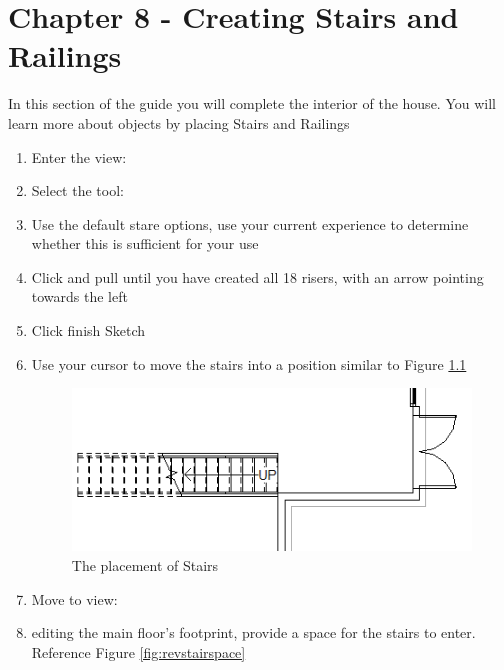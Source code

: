 \documentclass{tufte-book} %
\begin{document}
\chapter{Chapter 8 - Creating Stairs and Railings}
\label{ch:8}
In this section of the guide you will complete the interior of the house. You will learn more about objects by placing Stairs and Railings
\begin{enumerate}
\section{Creating Stairs}
	\item Enter the view: 
	\item Select the tool: 
	\item Use the default stare options, use your current experience to determine whether this is sufficient for your use
	\item Click and pull until you have created all 18 risers, with an arrow pointing towards the left
	\item Click finish Sketch
	\item Use your cursor to move the stairs into a position similar to Figure \ref{fig:revstairinit}
	
	\begin{figure}
		\includegraphics[width=\linewidth]{revitstairsinit.PNG}
		\caption{The placement of Stairs}
		\label{fig:revstairinit}
	\end{figure}
	
	\item Move to view:
	\item editing the main floor's footprint, provide a space for the stairs to enter. Reference Figure \ref{fig:revstairspace}
	

\end{enumerate}
\end{document}
